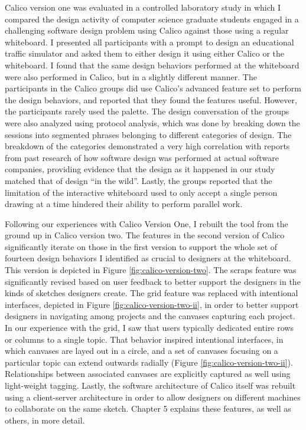 \documentclass[12pt,fleqn]{ucithesis}
\begin{document}
Calico version one was evaluated in a controlled laboratory study in which I compared the design activity of computer science graduate students engaged in a challenging software design problem using Calico against those using a regular whiteboard. I presented all participants with a prompt to design an educational traffic simulator and asked them to either design it using either Calico or the whiteboard. I found that the same design behaviors performed at the whiteboard were also performed in Calico, but in a slightly different manner. The participants in the Calico groups did use Calico's advanced feature set to perform the design behaviors, and reported that they found the features useful. However, the participants rarely used the palette. The design conversation of the groups were also analyzed using protocol analysis, which was done by breaking down the sessions into segmented phrases belonging to different categories of design. The breakdown of the categories demonstrated a very high correlation with reports from past research of how software design was performed at actual software companies, providing evidence that the design as it happened in our study matched that of design ``in the wild''. Lastly, the groups reported that the limitation of the interactive whiteboard used to only accept a single person drawing at a time hindered their ability to perform parallel work.

Following our experiences with Calico Version One, I rebuilt the tool from the ground up in Calico version two. The features in the second version of Calico significantly iterate on those in the first version to support the whole set of fourteen design behaviors I identified as crucial to designers at the whiteboard. This version is depicted in Figure \ref{fig:calico-version-two}. The scraps feature was significantly revised based on user feedback to better support the designers in the kinds of sketches designers create. The grid feature was replaced with intentional interfaces, depicted in Figure \ref{fig:calico-version-two-ii}, in order to better support designers in navigating among projects and the canvases capturing each project. In our experience with the grid, I saw that users typically dedicated entire rows or columns to a single topic. That behavior inspired intentional interfaces, in which canvases are layed out in a circle, and a set of canvases focusing on a particular topic can extend outwards radially (Figure \ref{fig:calico-version-two-ii}). Relationships between associated canvases are explicitly captured as well using light-weight tagging. Lastly, the software architecture of Calico itself was rebuilt using a client-server architecture in order to allow designers on different machines to collaborate on the same sketch. Chapter 5 explains these features, as well as others, in more detail.
\end{document}
